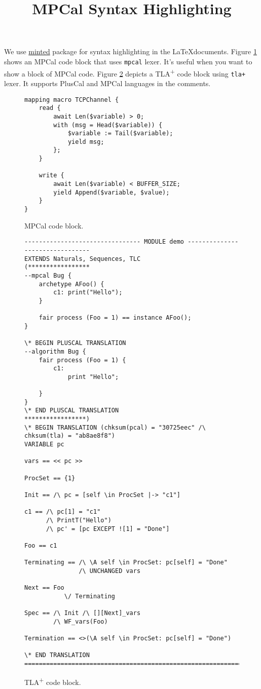 \documentclass[12pt]{article}
\begin{document}
\title{MPCal Syntax Highlighting}
\date{}

\maketitle

We use \href{https://ctan.org/pkg/minted?lang=en}{\textsf{minted}} package for syntax highlighting in the \LaTeX documents. Figure \ref{fig-mpcal} shows an MPCal code block that uses \texttt{mpcal} lexer. It's useful when you want to show a block of MPCal code. Figure \ref{fig-tlaplus} depicts a TLA\textsuperscript{+} code block using \texttt{tla+} lexer. It supports PlusCal and MPCal languages in the comments.

\begin{figure}[H]
	\begin{verbatim}
mapping macro TCPChannel {
    read {
        await Len($variable) > 0; 
        with (msg = Head($variable)) {
            $variable := Tail($variable);
            yield msg;
        };
    }

    write {
        await Len($variable) < BUFFER_SIZE;
        yield Append($variable, $value);
    }
}
	\end{verbatim}
  	\caption{MPCal code block.}
  	\label{fig-mpcal}
\end{figure}

\begin{figure}[H]
	\begin{verbatim}
-------------------------------- MODULE demo --------------------------------
EXTENDS Naturals, Sequences, TLC
(*****************
--mpcal Bug {
    archetype AFoo() {
        c1: print("Hello");
    }

    fair process (Foo = 1) == instance AFoo();
}

\* BEGIN PLUSCAL TRANSLATION
--algorithm Bug {
    fair process (Foo = 1) {
        c1:
            print "Hello";
    
    }
}
\* END PLUSCAL TRANSLATION
*****************)
\* BEGIN TRANSLATION (chksum(pcal) = "30725eec" /\ chksum(tla) = "ab8ae8f8")
VARIABLE pc

vars == << pc >>

ProcSet == {1}

Init == /\ pc = [self \in ProcSet |-> "c1"]

c1 == /\ pc[1] = "c1"
      /\ PrintT("Hello")
      /\ pc' = [pc EXCEPT ![1] = "Done"]

Foo == c1

Terminating == /\ \A self \in ProcSet: pc[self] = "Done"
               /\ UNCHANGED vars

Next == Foo
           \/ Terminating

Spec == /\ Init /\ [][Next]_vars
        /\ WF_vars(Foo)

Termination == <>(\A self \in ProcSet: pc[self] = "Done")

\* END TRANSLATION 
=============================================================================
	\end{verbatim}
  	\caption{TLA\textsuperscript{+} code block.}
  	\label{fig-tlaplus}
\end{figure}
\end{document}
